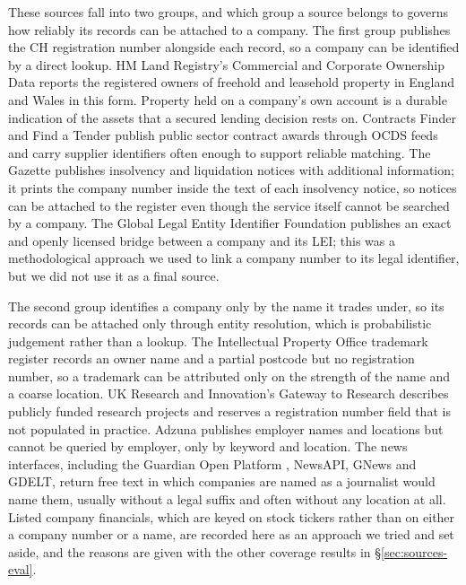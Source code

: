 \documentclass[    author={Samuel Menon Demelo; Sneha Saphala Ram Prasad; 
Viktor Ander Lindholm; Vishal Khatri},
               supervisor={Prof. Fernando Moreno-Pino},
                   degree={MSc},
                    title={Lloyds Commercial Banking Intelligence},
                 subtitle={Ranking SME Lending, Risk and Growth Prospects for Lloyds Banking Group},
                     type={},
                     year={2026}]{dissertation}
\begin{document}
These sources fall into two groups, and which group a source belongs to governs how reliably its records can be attached to a company. The first group publishes the CH registration number alongside each record, so a company can be identified by a direct lookup. HM Land Registry's Commercial and Corporate Ownership Data \cite{landregistry_ccod} reports the registered owners of freehold and leasehold property in England and Wales in this form. Property held on a company's own account is a durable indication of the assets that a secured lending decision rests on. Contracts Finder and Find a Tender publish public sector contract awards through OCDS feeds and carry supplier identifiers often enough to support reliable matching. The Gazette publishes insolvency and liquidation notices with additional information; it prints the company number inside the text of each insolvency notice, so notices can be attached to the register even though the service itself cannot be searched by a company. The Global Legal Entity Identifier Foundation \cite{gleif} publishes an exact and openly licensed bridge between a company and its LEI; this was a methodological approach we used to link a company number to its legal identifier, but we did not use it as a final source.

The second group identifies a company only by the name it trades under, so its records can be attached only through entity resolution, which is probabilistic judgement rather than a lookup. The Intellectual Property Office trademark register \cite{ukipo_tm} records an owner name and a partial postcode but no registration number, so a trademark can be attributed only on the strength of the name and a coarse location. UK Research and Innovation's Gateway to Research \cite{ukri_gtr} describes publicly funded research projects and reserves a registration number field that is not populated in practice. Adzuna \cite{adzuna_api} publishes employer names and locations but cannot be queried by employer, only by keyword and location. The news interfaces, including the Guardian Open Platform \cite{guardian_api}, NewsAPI, GNews and GDELT, return free text in which companies are named as a journalist would name them, usually without a legal suffix and often without any location at all. Listed company financials, which are keyed on stock tickers rather than on either a company number or a name, are recorded here as an approach we tried and set aside, and the reasons are given with the other coverage results in \S\ref{sec:sources-eval}.

\end{document}
